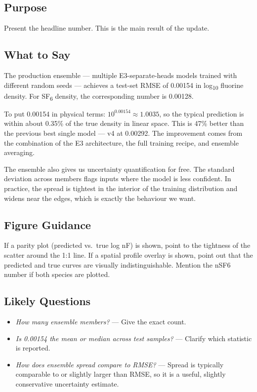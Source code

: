 \documentclass[12pt,a4paper]{article}
\begin{document}
\subsection*{Purpose}
Present the headline number. This is the main result of the
update.

\subsection*{What to Say}

The production ensemble --- multiple E3-separate-heads models trained
with different random seeds --- achieves a test-set RMSE of 0.00154
in log\textsubscript{10} fluorine density. For SF\textsubscript{6}
density, the corresponding number is 0.00128.

To put 0.00154 in physical terms: $10^{0.00154} \approx 1.0035$,
so the typical prediction is within about 0.35\% of the true density
in linear space. This is 47\% better than the previous best single
model --- v4 at 0.00292. The improvement comes from the combination
of the E3 architecture, the full training recipe, and ensemble
averaging.

The ensemble also gives us uncertainty quantification for free. The
standard deviation across members flags inputs where the model is
less confident. In practice, the spread is tightest in the interior
of the training distribution and widens near the edges, which is
exactly the behaviour we want.

\subsection*{Figure Guidance}
If a parity plot (predicted vs.\ true log nF) is shown, point to the
tightness of the scatter around the 1:1 line. If a spatial profile
overlay is shown, point out that the predicted and true curves are
visually indistinguishable. Mention the nSF6 number if both species
are plotted.

\subsection*{Likely Questions}
\begin{itemize}
  \item \emph{How many ensemble members?}
    --- Give the exact count.
  \item \emph{Is 0.00154 the mean or median across test samples?}
    --- Clarify which statistic is reported.
  \item \emph{How does ensemble spread compare to RMSE?}
    --- Spread is typically comparable to or slightly larger than
    RMSE, so it is a useful, slightly conservative uncertainty
    estimate.
\end{itemize}
\end{document}
